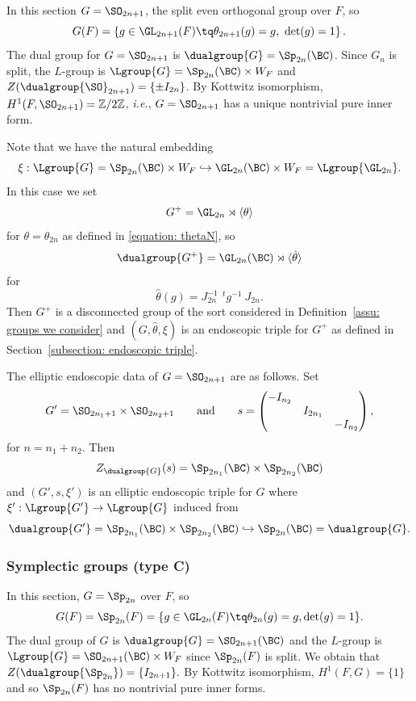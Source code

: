 \documentclass[11pt,letterpaper]{amsart}
\numberwithin{equation}{section}
\begin{document}
In this section $G = \SO_{2n+1}$, the split even orthogonal group over $F$, so
\[
G(F) 
=
\left\{
g\in \GL_{2n+1}(F) \tq 
\theta_{2n+1}(g) = g, \ \det(g) =1
\right\}.
\]
The dual group for $G = \SO_{2n+1}$ is
$\dualgroup{G}=\Sp_{2n}(\BC)$. Since $G_n$ is split, the $L$-group is $\Lgroup{G}=\Sp_{2n}(\BC) \times W_F$ and $Z(\dualgroup{\SO}_{2n+1})=\{\pm I_{2n}\}$. By Kottwitz isomorphism, $H^1(F,\SO_{2n+1})=\mathbb{Z}/2\mathbb{Z}$, {\it i.e.}, $G=\SO_{2n+1}$ has a unique nontrivial pure inner form.

Note that we have the natural embedding
$$\xi: \Lgroup{G}=\Sp_{2n}(\BC) \times W_F \hookrightarrow \GL_{2n}(\BC) \times W_F = \Lgroup{\GL_{2n}}.$$
In this case we set 
\[
G^+ = \GL_{2n}\rtimes \langle\theta \rangle
\]
for $\theta = \theta_{2n}$ as defined in \eqref{equation: thetaN}, so
\[
\dualgroup{G^+} = \GL_{2n}(\BC)\rtimes{\langle{\hat\theta}\rangle}
\]
for 
\begin{equation}\label{equation: theta B}
    {\hat\theta}(g) 
    =
    J_{2n}^{-1}\ \,^tg^{-1}\ J_{2n}.
\end{equation}
Then $G^+$ is a disconnected group of the sort considered in Definition~\ref{assu: groups we consider} and $(G, {\hat\theta} ,\xi)$ is an endoscopic triple for $G^+$ as defined in Section~\ref{subsection: endoscopic triple}.

The elliptic endoscopic data of $G=\SO_{2n+1}$ are as follows. 
Set
\begin{equation}\label{equation: s B}
G'= \SO_{2n_1+1} \times \SO_{2n_2+1}
\qquad\text{and}\qquad
s=\begin{pmatrix}
-I_{n_2}&&\\
&I_{2{n_1}}&\\
&&-I_{n_2}
\end{pmatrix},
\end{equation}
for $n=n_1+n_2$.
Then 
\[
Z_{\dualgroup{G}}(s) = \Sp_{2n_1}(\BC) \times \Sp_{2n_2}(\BC)
\]
and $(G',s,\xi')$ is an elliptic endoscopic triple for $G$ where $\xi' : \Lgroup{G'} \to \Lgroup{G}$ induced from 
\[
\dualgroup{G'} = \Sp_{2n_1}(\BC) \times \Sp_{2n_2}(\BC) \hookrightarrow \Sp_{2n}(\BC) = \dualgroup{G}.
\]



\subsubsection{Symplectic groups (type C)}\label{subsubsection: C}


In this section, $G = \Sp_{2n}$ over $F$, so 
\[
G(F) = \Sp_{2n}(F)
=
\{
g\in \GL_{2n}(F) \tq \theta_{2n}(g) = g, \det(g) =1
\}.
\]
The dual group of $G$ is
$\dualgroup{G} =\SO_{2n+1}(\BC)$ and the $L$-group is $\Lgroup{G}=\SO_{2n+1}(\BC) \times W_F$ since $\Sp_{2n}(F)$ is split. We obtain that $Z(\dualgroup{\Sp_{2n}})=\{I_{2n+1}\}.$ By Kottwitz isomorphism, $H^1(F,G)=\{1\}$ and so $\Sp_{2n}(F)$ has no nontrivial pure inner forms.
\end{document}
